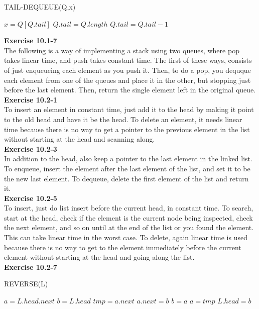 \documentclass{article}
\begin{document}
\begin{algorithm}
\caption{TAIL-DEQUEUE(Q,x)}
\begin{algorithmic}
\State $x = Q[Q.tail]$
\State $Q.tail = Q.length$
\Else
\State $Q.tail = Q.tail-1$
\EndIf
\end{algorithmic}
\end{algorithm}



\noindent\textbf{ Exercise 10.1-7} \\
The following is a way of implementing a stack using two queues, where pop takes linear time, and push takes constant time. The first of these ways, consists of just enqueueing each element as you push it. Then, to do a pop, you dequque each element from one of the queues and place it in the other, but stopping just before the last element. Then, return the single element left in the original queue.\\



\noindent\textbf{ Exercise 10.2-1} \\
To insert an element in constant time, just add it to the head by making it point to the old head and have it be the head. To delete an element, it needs linear time because there is no way to get a pointer to the previous element in the list without starting at the head and scanning along.\\


\noindent\textbf{ Exercise 10.2-3} \\
In addition to the head, also keep a pointer to the last element in the linked list. To enqueue, insert the element after the last element of the list, and set it to be the new last element. To dequeue, delete the first element of the list and return it.\\

\noindent\textbf{ Exercise 10.2-5} \\
To insert, just do list insert before the current head, in constant time. To search, start at the head, check if the element is the current node being inspected, check the next element, and so on until at the end of the list or you found the element. This can take linear time in the worst case. To delete, again linear time is used because there is no way to get to the element immediately before the current element without starting at the head and going along the list.\\

\noindent\textbf{ Exercise 10.2-7} \\
\begin{algorithm}
\caption{REVERSE(L)}
\begin{algorithmic}
\State $a = L.head.next$
\State $b = L.head$
\State $tmp = a.next$
\State $a.next = b$
\State $b = a$
\State $a= tmp$
\EndWhile
\State $L.head  = b$
\end{algorithmic}
\end{algorithm}
\end{document}
